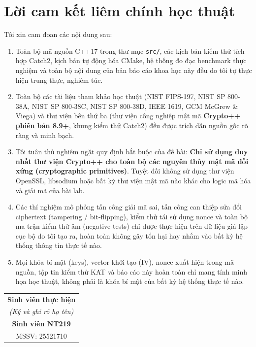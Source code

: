 \documentclass[12pt, a4paper]{report}
\newcommand{\studentname}{Sinh viên NT219}
\newcommand{\studentid}{25521710}
\begin{document}

\chapter*{Lời cam kết liêm chính học thuật}

Tôi xin cam đoan các nội dung sau:
\begin{enumerate}
    \item Toàn bộ mã nguồn C++17 trong thư mục \texttt{src/}, các kịch bản kiểm thử tích hợp Catch2, kịch bản tự động hóa CMake, hệ thống đo đạc benchmark thực nghiệm và toàn bộ nội dung của bản báo cáo khoa học này đều do tôi tự thực hiện trung thực, nghiêm túc.
    \item Toàn bộ các tài liệu tham khảo học thuật (NIST FIPS-197, NIST SP 800-38A, NIST SP 800-38C, NIST SP 800-38D, IEEE 1619, GCM McGrew \& Viega) và thư viện bên thứ ba (thư viện công nghiệp mật mã \textbf{Crypto++ phiên bản 8.9+}, khung kiểm thử Catch2) đều được trích dẫn nguồn gốc rõ ràng và minh bạch.
    \item Tôi tuân thủ nghiêm ngặt quy định bắt buộc của đề bài: \textbf{Chỉ sử dụng duy nhất thư viện Crypto++ cho toàn bộ các nguyên thủy mật mã đối xứng (cryptographic primitives)}. Tuyệt đối không sử dụng thư viện OpenSSL, libsodium hoặc bất kỳ thư viện mật mã nào khác cho logic mã hóa và giải mã của bài lab.
    \item Các thí nghiệm mô phỏng tấn công giải mã sai, tấn công can thiệp sửa đổi ciphertext (tampering / bit-flipping), kiểm thử tái sử dụng nonce và toàn bộ ma trận kiểm thử âm (negative tests) chỉ được thực hiện trên dữ liệu giả lập cục bộ do tôi tạo ra, hoàn toàn không gây tổn hại hay nhắm vào bất kỳ hệ thống thông tin thực tế nào.
    \item Mọi khóa bí mật (keys), vector khởi tạo (IV), nonce xuất hiện trong mã nguồn, tập tin kiểm thử KAT và báo cáo này hoàn toàn chỉ mang tính minh họa học thuật, không phải là khóa bí mật của bất kỳ hệ thống thực tế nào.
\end{enumerate}

\vspace{1.5cm}
\begin{flushright}
\begin{tabular}{c}
\textbf{Sinh viên thực hiện} \\
\textit{(Ký và ghi rõ họ tên)} \\[2cm]
\textbf{\studentname} \\
MSSV: \studentid
\end{tabular}
\end{flushright}
\clearpage
\end{document}
